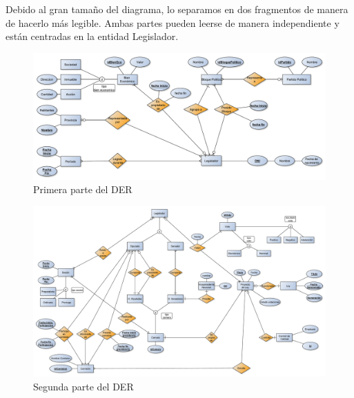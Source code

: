 Debido al gran tama\~no del diagrama, lo separamos en dos fragmentos de manera de hacerlo m\'as legible. Ambas partes pueden leerse de manera independiente y est\'an centradas en la entidad Legislador.
			
		\begin{figure}[H]
		  \begin{center}
		    \includegraphics[scale=.41,angle=-90]{./imagenes/DER2-arriba.pdf}
		    \caption{Primera parte del DER} 
		    \label{fig:derparte1}
		  \end{center}
		\end{figure}
				
		\begin{figure}[H]
		  \begin{center}
		    \includegraphics[scale=.39,angle=-90]{./imagenes/DER2-abajo.pdf}
		    \caption{Segunda parte del DER} 
		    \label{fig:derparte2}
		  \end{center}
		\end{figure}